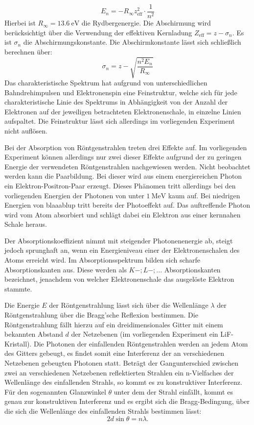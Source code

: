 \begin{equation}
  E_n=-R_\infty z_\mathrm{eff}^2 \cdot \frac{1}{n^2}
\end{equation}
Hierbei ist $R_\infty=\SI{13.6}{\electronvolt}$ die Rydbergenergie. Die Abschirmung wird berücksichtigt über die Verwendung der effektiven Kernladung $Z_\mathrm{eff}=z-\sigma_n$. Es ist $\sigma_n$ die Abschirmungskonstante.
Die Abschirmkonstante lässt sich schließlich berechnen über:
\begin{equation}
  \sigma_n=z-\sqrt{\frac{n^2 E_n}{R_\infty}}
\end{equation}
Das charakteristische Spektrum hat aufgrund von unterschiedlichen Bahndrehimpulsen und Elektronenspin eine Feinstruktur, welche sich für jede charakteristische Linie des Spektrums in Abhängigkeit von der Anzahl der Elektronen auf der jeweiligen betrachteten Elektronenschale, in einzelne Linien aufspaltet.
Die Feinstruktur lässt sich allerdings im vorliegenden Experiment nicht auflösen.

Bei der Absorption von Röntgenstrahlen treten drei Effekte auf. Im vorliegenden Experiment können allerdings nur zwei dieser Effekte aufgrund der zu geringen Energie der verwendeten Röntgenstrahlen nachgewiesen werden.
Nicht beobachtet werden kann die Paarbildung. Bei dieser wird aus einem energiereichen Photon ein Elektron-Positron-Paar erzeugt. Dieses Phänomen tritt allerdings bei den vorliegenden Energien der Photonen von unter $\SI{1}{\mega\electronvolt}$ kaum auf.
Bei niedrigen Energien von blaaablup tritt bereits der Photoeffekt auf. Das auftreffende Photon wird vom Atom absorbiert und schlägt dabei ein Elektron aus einer kernnahen Schale heraus.

Der Absorptionskoeffizient nimmt mit steigender Photonenenergie ab, steigt jedoch sprunghaft an, wenn ein Energieniveau einer der Elektronenschalen des Atoms erreicht wird.
Im Absorptionsspektrum bilden sich scharfe Absorptionskanten aus. Diese werden als $K-;L-;...$ Absorptionskanten bezeichnet, jenachdem von welcher Elektronenschale das ausgelöste Elektron stammte.


Die Energie $E$ der Röntgenstrahlung lässt sich über die Wellenlänge $\lambda$ der Röntgenstrahlung über die Bragg'sche Reflexion bestimmen.
Die Röntgenstrahlung fällt hierzu auf ein dreidimensionales Gitter mit einem bekannten Abstand $d$ der Netzebenen (im vorliegenden Experiment ein LiF-Kristall). Die Photonen der einfallenden Röntgenstrahlen werden an jedem Atom des Gitters gebeugt, es findet somit eine Interferenz der an verschiedenen Netzebenen gebeugten Photonen statt.
Beträgt der Gangunterschied zwischen zwei an verschiedenen Netzebenen reflektierten Strahlen ein n-Vielfaches der Wellenlänge des einfallenden Strahls, so kommt es zu konstruktiver Interferenz.
Für den sogenannten Glanzwinkel $\theta$ unter dem der Strahl einfällt, kommt es genau zur konstruktiven Interferenz und  es ergibt sich die Bragg-Bedingung, über die sich die Wellenlänge des einfallenden Strahls bestimmen lässt:
\begin{equation}
  2d \sin{\theta}=n\lambda \text{.}
\end{equation}



\cite{Anleitung}
